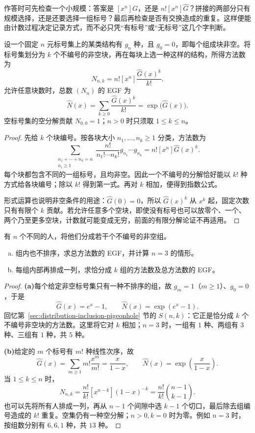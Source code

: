 \documentclass[lang=cn,a4paper,fontset=none,zihao=false,10pt,openany,twoside]{beautybook}
\numberwithin{algorithm}{chapter}
\begin{document}
作答时可先检查一个小规模：答案是 $[x^n]G$，还是 $n![x^n]\widehat G$？拼接的两部分只有规模选择，还是还要选择一组标号？最后再检查是否有交换造成的重复。这样便能由计数过程决定记录方式，而不必只凭“有标号”或“无标号”这几个字判断。


\begin{theorem}[指数公式]\label{thm:exponential-formula}
设一个固定 $n$ 元标号集上的某类结构有 $g_n$ 种，且 $g_0=0$，即每个组成块非空。将标号集划分为 $k$ 个不编号的非空块，再在每块上选一种这样的结构，所得方法数为
\[
 N_{n,k}=n![x^n]\frac{\widehat G(x)^k}{k!}.
\]
允许任意块数时，总数 $(N_n)$ 的 EGF 为
\[
 \widehat N(x)=\sum_{k\ge0}\frac{\widehat G(x)^k}{k!}
 =\exp\bigl(\widehat G(x)\bigr).
\]
空标号集的空分解贡献 $N_{0,0}=1$；$n>0$ 时只须取 $1\le k\le n$。
\end{theorem}
\begin{proof}
先给 $k$ 个块编号。按各块大小 $n_1,\ldots,n_k\ge1$ 分类，方法数为
\[
 \sum_{\substack{n_1+\cdots+n_k=n\\n_i\ge1}}
 \frac{n!}{n_1!\cdots n_k!}g_{n_1}\cdots g_{n_k}
 =n![x^n]\widehat G(x)^k.
\]
每个块都包含不同的一组标号，且均非空。因此一个不编号的分解恰好能以 $k!$ 种方式给各块编号；除以 $k!$ 得到第一式。再对 $k$ 相加，便得到指数公式。

形式运算也说明非空条件的用途：$\widehat G(0)=0$，所以 $\widehat G(x)^k$ 从 $x^k$ 起，固定次数只有有限个 $k$ 贡献。若允许任意多个空块，即使没有标号也可以放零个、一个、两个乃至更多空块，计数就可能变成无穷，前面的有限分解论证不再适用。
\end{proof}

\begin{example}[集合分拆与块内排列]
有 $n$ 个不同的人，将他们分成若干个不编号的非空组。
\begin{enumerate}[(a)]
\item 组内也不排序，求总方法数的 EGF，并计算 $n=3$ 的情形。
\item 每组内部再排成一列，求恰分成 $k$ 组的方法数及总方法数的 EGF。
\end{enumerate}
\end{example}
\begin{proof}
\par\smallskip\noindent\textbf{(a)}\quad 每个给定非空标号集只有一种不排序的组，故 $g_m=1$（$m\ge1$）、$g_0=0$，于是
\[
 \widehat G(x)=e^x-1,\qquad
 \widehat N(x)=\exp(e^x-1).
\]
回忆第~\ref{sec:distribution-inclusion-pigeonhole} 节的 $S(n,k)$：它正是恰分成 $k$ 个不编号非空块的方法数。这里将它对 $k$ 相加；$n=3$ 时，一组有 $1$ 种、两组有 $3$ 种、三组有 $1$ 种，共 $5$ 种。

\par\smallskip\noindent\textbf{(b)}\quad 给定的 $m$ 个标号有 $m!$ 种线性次序，故
\[
 \widehat G(x)=\sum_{m\ge1}m!\frac{x^m}{m!}
 =\frac{x}{1-x},\qquad
 \widehat N(x)=\exp\left(\frac{x}{1-x}\right).
\]
当 $1\le k\le n$ 时，
\[
 N_{n,k}=\frac{n!}{k!}[x^{n-k}](1-x)^{-k}
 =\frac{n!}{k!}\binom{n-1}{k-1}.
\]
也可以先将所有人排成一列，再从 $n-1$ 个间隙中选 $k-1$ 个切口，最后除去组编号造成的 $k!$ 重复。空集仍有一种空分解；$n>0,k=0$ 时为零。例如 $n=3$ 时，按组数分别有 $6,6,1$ 种，共 $13$ 种。
\end{proof}
\end{document}
